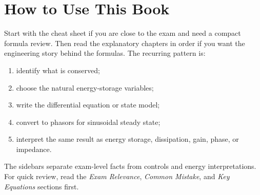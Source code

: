 \chapter*{How to Use This Book}
Start with the cheat sheet if you are close to the exam and need a compact
formula review. Then read the explanatory chapters in order if you want the
engineering story behind the formulas. The recurring pattern is:
\begin{enumerate}
\item identify what is conserved;
\item choose the natural energy-storage variables;
\item write the differential equation or state model;
\item convert to phasors for sinusoidal steady state;
\item interpret the same result as energy storage, dissipation, gain, phase, or
impedance.
\end{enumerate}

The sidebars separate exam-level facts from controls and energy interpretations.
For quick review, read the \emph{Exam Relevance}, \emph{Common Mistake}, and
\emph{Key Equations} sections first.

